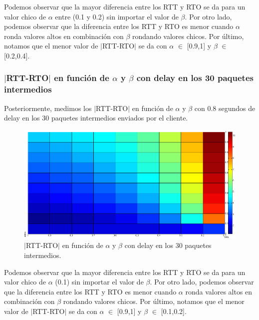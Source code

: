 \documentclass[10pt, a4paper]{article}
\begin{document}
Podemos observar que la mayor diferencia entre los RTT y RTO se da para un valor chico de $\alpha$ entre (0.1 y 0.2) sin importar el valor de $\beta$.
Por otro lado, podemos observar que la diferencia entre los RTT y RTO es menor cuando $\alpha$ ronda valores altos en combinación con $\beta$ rondando valores chicos.
Por último, notamos que el menor valor de $|$RTT-RTO$|$ se da con $\alpha$ $\in$ [0.9,1] y $\beta$ $\in$ [0.2,0.4].


\subsubsection{$|$RTT-RTO$|$ en función de $\alpha$ y $\beta$ con delay en los 30 paquetes intermedios}
Posteriormente, medimos los $|$RTT-RTO$|$ en función de $\alpha$ y $\beta$ con 0.8 segundos de delay en los 30 paquetes intermedios enviados por el cliente.

\begin{figure}[H]
\begin{center}
\includegraphics[width=17cm]{delay-30I.png}
\caption{$|$RTT-RTO$|$ en función de $\alpha$ y $\beta$ con delay en los 30 paquetes intermedios.}
\end{center}
\end{figure}

Podemos observar que la mayor diferencia entre los RTT y RTO se da para un valor chico de $\alpha$ (0.1) sin importar el valor de $\beta$.
Por otro lado, podemos observar que la diferencia entre los RTT y RTO es menor cuando $\alpha$ ronda valores altos en combinación con $\beta$ rondando valores chicos.
Por último, notamos que el menor valor de $|$RTT-RTO$|$ se da con $\alpha$ $\in$ [0.9,1] y $\beta$ $\in$ [0.1,0.2].
\end{document}
